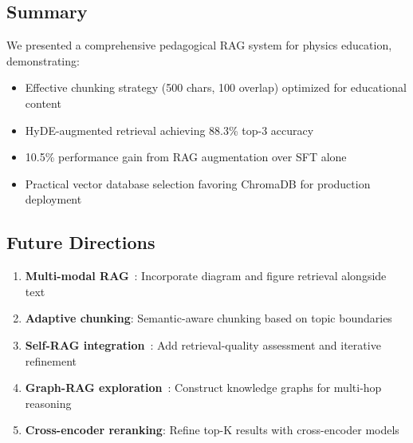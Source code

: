 \documentclass[11pt,a4paper]{article}
\begin{document}
\subsection{Summary}

We presented a comprehensive pedagogical RAG system for physics education, demonstrating:
\begin{itemize}
    \item Effective chunking strategy (500 chars, 100 overlap) optimized for educational content
    \item HyDE-augmented retrieval achieving 88.3\% top-3 accuracy
    \item 10.5\% performance gain from RAG augmentation over SFT alone
    \item Practical vector database selection favoring ChromaDB for production deployment
\end{itemize}

\subsection{Future Directions}

\begin{enumerate}
    \item \textbf{Multi-modal RAG}~\cite{kembhavi2016diagram}: Incorporate diagram and figure retrieval alongside text
    \item \textbf{Adaptive chunking}: Semantic-aware chunking based on topic boundaries
    \item \textbf{Self-RAG integration}~\cite{asai2023selfrag}: Add retrieval-quality assessment and iterative refinement
    \item \textbf{Graph-RAG exploration}~\cite{edge2024local}: Construct knowledge graphs for multi-hop reasoning
    \item \textbf{Cross-encoder reranking}: Refine top-K results with cross-encoder models
\end{enumerate}



\end{document}
